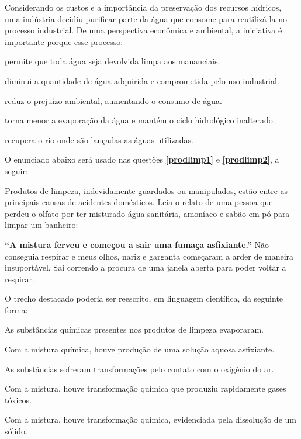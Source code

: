 \questao
Considerando os custos e a importância da preservação dos recursos hídricos, uma indústria decidiu purificar parte da água que consome para reutilizá-la no processo industrial. De uma perspectiva econômica e ambiental, a iniciativa é importante porque esse processo:
\begin{alternativas}
\item permite que toda água seja devolvida limpa aos mananciais.
\item diminui a quantidade de água adquirida e comprometida pelo uso industrial.
\item reduz o prejuízo ambiental, aumentando o consumo de água.
\item torna menor a evaporação da água e mantém o ciclo hidrológico inalterado.
\item recupera o rio onde são lançadas as águas utilizadas.
\end{alternativas}

\separador
\noindent O enunciado abaixo será usado nas questões \textbf{\ref{prodlimp1}} e \textbf{\ref{prodlimp2}}, a seguir:

Produtos de limpeza, indevidamente guardados ou manipulados, estão entre as principais causas de acidentes domésticos. Leia o relato de uma pessoa que perdeu o olfato por ter misturado água sanitária, amoníaco e sabão em pó para limpar um banheiro:

\textbf{``A mistura ferveu e começou a sair uma fumaça asfixiante.''} Não conseguia respirar e meus olhos, nariz e garganta começaram a arder de maneira insuportável. Saí correndo a procura de uma janela aberta para poder voltar a respirar.

\medskip
\questao\label{prodlimp1}
O trecho destacado poderia ser reescrito, em linguagem científica, da seguinte forma:
\begin{alternativas}
\item As substâncias químicas presentes nos produtos de limpeza evaporaram.
\item Com a mistura química, houve produção de uma solução aquosa asfixiante.
\item As substâncias sofreram transformações pelo contato com o oxigênio do ar.
\item Com a mistura, houve transformação química que produziu rapidamente gases tóxicos.
\item Com a mistura, houve transformação química, evidenciada pela dissolução de um sólido.
\end{alternativas}

